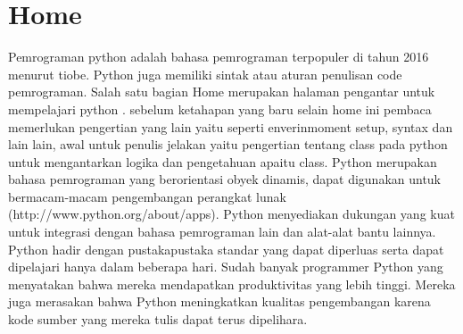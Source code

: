 \section {Home}
    Pemrograman python adalah bahasa pemrograman terpopuler di tahun 2016 menurut tiobe. Python juga memiliki sintak atau aturan penulisan code pemrograman. Salah satu bagian Home merupakan halaman pengantar untuk mempelajari python . sebelum ketahapan yang baru selain home ini pembaca memerlukan pengertian yang lain yaitu seperti enverinmoment setup, syntax dan lain lain, awal untuk penulis jelakan yaitu pengertian tentang class pada python untuk mengantarkan logika dan pengetahuan apaitu class.
    Python merupakan bahasa pemrograman yang berorientasi obyek dinamis, dapat digunakan untuk bermacam-macam pengembangan perangkat lunak (http://www.python.org/about/apps). Python menyediakan dukungan yang kuat untuk integrasi dengan bahasa pemrograman lain dan alat-alat bantu lainnya. Python hadir dengan pustakapustaka standar yang dapat diperluas serta dapat dipelajari hanya dalam beberapa hari. Sudah banyak programmer Python yang menyatakan bahwa mereka mendapatkan produktivitas yang lebih tinggi. Mereka juga merasakan bahwa Python meningkatkan kualitas pengembangan karena kode sumber yang mereka tulis dapat terus dipelihara.

